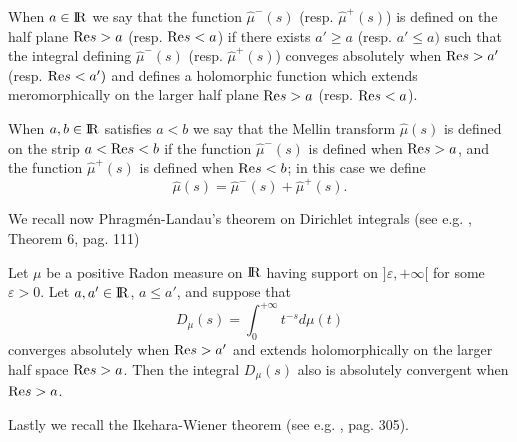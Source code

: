 \documentclass[12pt,a4paper]{amsart}
\begin{document}
When $a\in{{\rm I\kern-.185em R}}$
we say that the function
$\hat{\mu}^-({s})$ (resp. $\hat{\mu}^+({s})$) 
is defined on the half plane
${\mathop{\rm Re}\nolimits}{s}>a$ (resp. ${\mathop{\rm Re}\nolimits}{s}<a$)
if there exists $a'\geq a$ (resp. $a'\leq a)$
such that the integral defining
$\hat{\mu}^-({s})$ (resp. $\hat{\mu}^+({s})$)
conveges absolutely when ${\mathop{\rm Re}\nolimits} s>a'$ (resp. ${\mathop{\rm Re}\nolimits} s<a')$
and defines a holomorphic function which extends
meromorphically on the larger half plane
${\mathop{\rm Re}\nolimits}{s}>a$ (resp. ${\mathop{\rm Re}\nolimits}{s}<a$).

When $a,b\in{{\rm I\kern-.185em R}}$ satisfies $a<b$
we say that the Mellin transform $\hat{\mu}({s})$
is defined on the strip $a<{\mathop{\rm Re}\nolimits}{s}<b$ if
the function $\hat{\mu}^-({s})$
is defined when ${\mathop{\rm Re}\nolimits}{s}>a$,
and the function $\hat{\mu}^+({s})$
is defined when ${\mathop{\rm Re}\nolimits}{s}<b$;
in this case we define
\begin{equation}\nonumber
	\hat{\mu}({s})=
	\hat{\mu}^-({s})+
	\hat{\mu}^+({s}).
\end{equation}

We recall now Phragm\'en-Landau's theorem on Dirichlet integrals
(see e.g. \cite{book:TenenbaumAnalyticNumberTheory}, Theorem 6, pag. 111)

\begin{theorem}\label{thm::Landau}
Let ${\mu}$ be a positive Radon measure on ${{\rm I\kern-.185em R}}$ having
support on $]\varepsilon,+\infty[$ for some $\varepsilon>0$.
Let $a,a'\in{{\rm I\kern-.185em R}}$, $a\leq a'$, and suppose that
\begin{equation}\nonumber
{D_{{\mu}}}({s})=
\int_0^{+\infty}{t}^{-{s}}d{\mu}({t})
\end{equation}
converges absolutely when ${\mathop{\rm Re}\nolimits}{s}>a'$
and extends holomorphically on the larger half space
${\mathop{\rm Re}\nolimits}{s}>a$.
Then the integral ${D_{{\mu}}}({s})$
also is absolutely convergent when ${\mathop{\rm Re}\nolimits}{s}>a$.
\end{theorem}

Lastly we recall the Ikehara-Wiener theorem
(see e.g. \cite{book:LangAlgebraicNumerTheory}, pag. 305).
\end{document}
